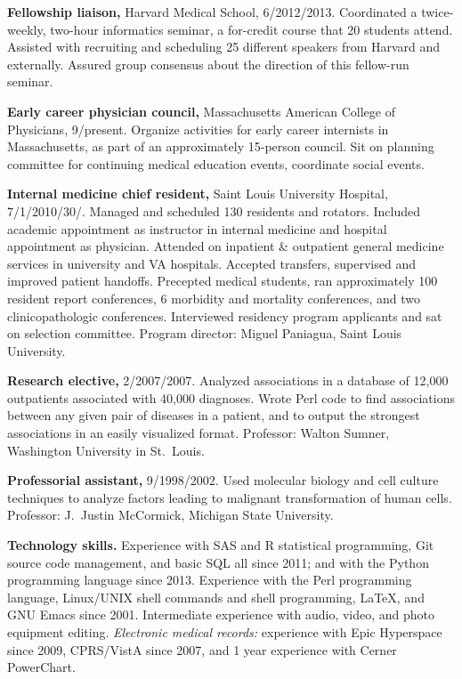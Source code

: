 \documentclass[10pt]{article}
\begin{document}
\textbf{Fellowship liaison,} Harvard Medical School,
6/2012/2013. Coordinated a twice-week\-ly, two-hour informatics
seminar, a for-credit course that 20 students attend. Assisted with
recruiting and scheduling 25 different speakers from Harvard and
externally. Assured group consensus about the direction of this
fellow-run seminar.

\textbf{Early career physician council,} Massachusetts American
College of Physicians,
9/\ndash{}\linebreak[0]pres\-ent. Organize activities
for early career internists in Massachusetts, as part of an
approximately 15-person council. Sit on planning committee for
continuing medical education events, coordinate social events.

\textbf{Internal medicine chief resident,} Saint Louis University
Hospital, 7/1/2010\ndash{}/30/. Managed
and scheduled 130 residents and rotators. Included academic
appointment as instructor in internal medicine and hospital
appointment as physician. Attended on inpatient \& outpatient general
medicine services in university and VA hospitals. Accepted transfers,
supervised and improved patient handoffs. Precepted medical students,
ran approximately 100 resident report conferences, 6 morbidity and
mortality conferences, and two clinicopathologic conferences.
Interviewed residency program applicants and sat on selection
committee. Program director: Miguel Paniagua, Saint Louis University.

\textbf{Research elective,} 2/2007/2007. Analyzed associations
in a database of 12,000 outpatients associated with 40,000 diagnoses.
Wrote Perl code to find associations between any given pair of
diseases in a patient, and to output the strongest associations in an
easily visualized format. Professor: Walton Sumner, Washington
University in St.\ Louis.

\textbf{Professorial assistant,} 9/1998/2002. Used molecular
biology and cell culture techniques to analyze factors leading to
malignant transformation of human cells. Professor: J.\ Justin
McCormick, Michigan State University.

\textbf{Technology skills.} Experience with SAS and R statistical
programming, Git source code management, and basic SQL all since 2011;
and with the Python programming language since 2013. Experience with
the Perl programming language, Linux/UNIX shell commands and shell
programming, \LaTeX, and GNU Emacs since 2001. Intermediate experience
with audio, video, and photo equipment editing. \emph{Electronic
  medical records:} experience with Epic Hyperspace since 2009,
CPRS/VistA since 2007, and 1 year experience with Cerner PowerChart.
\end{document}
